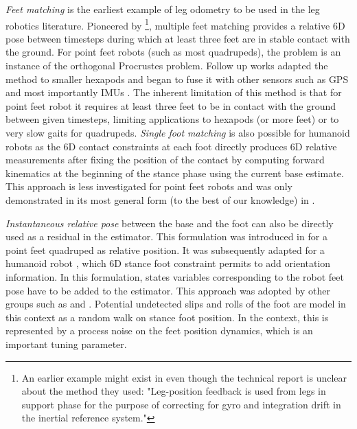 \textit{Feet matching} is the earliest example of leg odometry to be used in the leg robotics literature. Pioneered by \cite{roston1991dead} 
\footnote{An earlier example might exist in \cite{waldron1986adaptive} even though the technical report is unclear about the method they used: 
"Leg-position feedback is used from legs in support phase for the purpose of correcting for gyro and integration drift in the inertial reference system."},
multiple feet matching provides a relative 6D pose between timesteps during which at least three feet are in stable contact with the ground.
For point feet robots (such as most quadrupeds), the problem %
is an instance of the orthogonal Procrustes problem.
Follow up works adapted the method to smaller hexapods \cite{lin2005leg} and began to fuse it with other sensors such as GPS \cite{gassmann2005localization, cobano2008location} 
and most importantly IMUs \cite{lin2006sensor, reinstein2011dead}.
The inherent limitation of this method is that for point feet robot it requires at least three feet to be in contact with the ground between given timesteps, limiting
applications to hexapods (or more feet) or to very slow gaits for quadrupeds.
\textit{Single foot matching} is also possible for humanoid robots as the 6D contact constraints at each foot directly produces 6D 
relative measurements \cite{flayols2017experimental,xinjilefu2014decoupled,johnson2015team} after fixing the position of the contact by computing forward kinematics 
at the beginning of the stance phase using the current base estimate. This approach is less investigated for point feet robots and was only 
demonstrated in its most general form (to the best of our knowledge) in \cite{fourmy2021contact}.

\textit{Instantaneous relative pose} between the base and the foot can also be directly used as a residual in the estimator. This formulation
was introduced in \cite{bloesch2013state, bloesch2013stateSlippery} for a point feet quadruped as relative position. It was subsequently adapted for a humanoid robot \cite{rotella2014state}, 
which 6D stance foot constraint permits to add orientation information. In this formulation, states variables corresponding to the robot feet pose have to 
be added to the estimator. This approach was adopted by other groups such as \cite{hartley2018legged, hartley2018hybrid, hartley2020contact} and \cite{bledt2018cheetah}.
Potential undetected slips and rolls of the foot are model in this context as a random walk on stance foot position. In the \KalmanF context, this is represented 
by a process noise on the feet position dynamics, which is an important tuning parameter.

